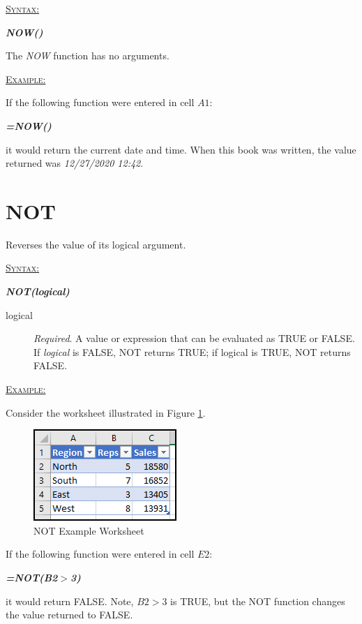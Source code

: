 \begin{addmargin}[1cm]{0cm}
	
	\medskip
	\underline{\textsc{Syntax:}}
	\medskip
	
	{\color{Syntax}
		\noindent\textbf{\textit{NOW()}}
	}
	
	\medskip
	\noindent The \textit{NOW} function has no arguments.
	
	\medskip
	\noindent\underline{\textsc{Example:}}
	\medskip
	
	\noindent If the following function were entered in cell $ A1 $:
	
	{\color{Syntax}
		\textit{\textbf{=NOW()}}
	}
	
	\noindent it would return the current date and time. When this book was written, the value returned was \textit{12/27/2020 12:42}.
		
\end{addmargin}

\section{NOT}

Reverses the value of its logical argument. 

\begin{addmargin}[1cm]{0cm}
	
	\medskip
	\underline{\textsc{Syntax:}}
	\medskip
	
	{\color{Syntax}
		\noindent\textbf{\textit{NOT(logical)}}
	}
	
	\begin{description}
		\item[logical] \textit{Required}. A value or expression that can be evaluated as TRUE or FALSE. If \textit{logical} is FALSE, NOT returns TRUE; if logical is TRUE, NOT returns FALSE.
	\end{description}

	\medskip
\noindent\underline{\textsc{Example:}}
\medskip

\noindent Consider the worksheet illustrated in Figure \ref{apa:not}.

\begin{figure}[H]
	\centering
	\includegraphics[width=\maxwidth{.45\linewidth}]{gfx/apa_fig01}
	\caption{NOT Example Worksheet}
	\label{apa:not}
\end{figure}

\noindent If the following function were entered in cell $ E2 $:

{\color{Syntax}
	\textit{\textbf{=NOT(B2$ > $3)}}
}

\noindent it would return FALSE. Note, $ B2 > 3 $ is TRUE, but the NOT function changes the value returned to FALSE.

\end{addmargin}

